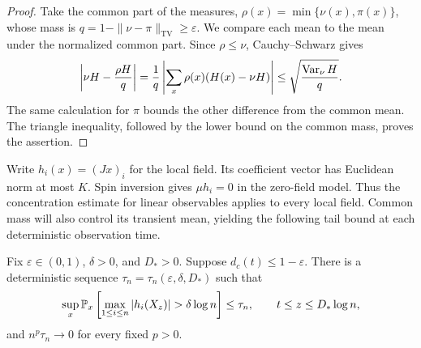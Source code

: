 \begin{proof}
Take the common part of the measures,
$\rho(x)=\min\{\nu(x),\pi(x)\}$, whose mass is
$q=1-\|\nu-\pi\|_{\mathrm{TV}}\ge\varepsilon$.
We compare each mean to the mean under the normalized common part.
Since $\rho\le\nu$, Cauchy--Schwarz gives
\[
 \left|\nu H-\frac{\rho H}{q}\right|
 =\frac1q\left|\sum_x\rho(x)(H(x)-\nu H)\right|
 \le\sqrt{\frac{\operatorname{Var}_\nu H}{q}}.
\]
The same calculation for $\pi$ bounds the other difference from the
common mean.  The triangle inequality, followed by the lower bound on
the common mass, proves the assertion.
\end{proof}

Write $h_i(x)=(Jx)_i$ for the local field.  Its coefficient vector has
Euclidean norm at most $K$.  Spin inversion gives $\mu h_i=0$ in the
zero-field model.  Thus the concentration estimate for linear
observables applies to every local field.  Common mass will also
control its transient mean, yielding the following tail bound at each
deterministic observation time.

\begin{lemma}
\label{rcut:lem:cutoff-field-tails}
Fix $\varepsilon\in(0,1)$, $\delta>0$, and $D_*>0$.
Suppose $d_c(t)\le1-\varepsilon$.  There is a deterministic sequence
$\tau_n=\tau_n(\varepsilon,\delta,D_*)$ such that
\begin{equation}
 \sup_x\P_x\left[\max_{1\le i\le n}|h_i(X_z)|>\delta\log n\right]
 \le\tau_n,
 \qquad t\le z\le D_*\log n,
 \label{rcut:eq:cutoff-field-tails}
\end{equation}
and $n^p\tau_n\to0$ for every fixed $p>0$.
\end{lemma}

